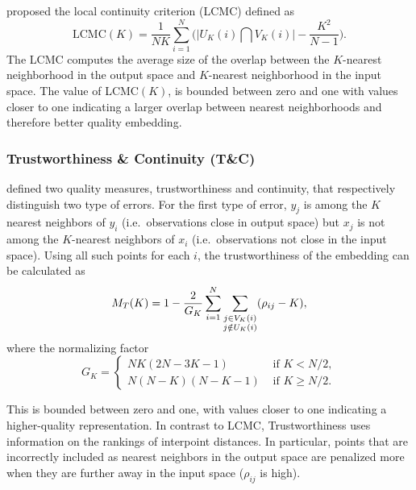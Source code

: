 \documentclass[11pt,a4paper,]{article}
\begin{document}
\textcite{Chen2009-su} proposed the local continuity criterion (LCMC) defined as
\begin{equation}\label{eq:LCMC}
  \text{LCMC}(K)=\frac{1}{N K} \sum_{i=1}^{N}\Big(\big| U_K(i) \bigcap V_K(i) \big| - \frac{K^{2}}{N-1}\Big).
\end{equation}
The LCMC computes the average size of the overlap between the \(K\)-nearest neighborhood in the output space and \(K\)-nearest neighborhood in the input space. The value of LCMC\((K)\), is bounded between zero and one with values closer to one indicating a larger overlap between nearest neighborhoods and therefore better quality embedding.

\hypertarget{trustworthiness-continuity-tc}{%
\subsubsection*{Trustworthiness \& Continuity (T\&C)}\label{trustworthiness-continuity-tc}}

\textcite{Venna2006-nd} defined two quality measures, trustworthiness and continuity, that respectively distinguish two type of errors. For the first type of error, \(y_j\) is among the \(K\) nearest neighbors of \(y_i\) (i.e.~observations close in output space) but \(x_j\) is not among the \(K\)-nearest neighbors of \(x_i\) (i.e.~observations not close in the input space). Using all such points for each \(i\), the trustworthiness of the embedding can be calculated as
\begin{equation}\label{eq:trustworthiness}
  M_{T}(K)=1-\frac{2}{G_{K}} \sum_{i=1}^{N} \sum\limits_{\begin{subarray}{c}j \in V_{K}(i)\\j \notin U_{K}(i)\end{subarray}}(\rho_{ij}-K),
\end{equation}
where the normalizing factor
\[
  G_{K}=\left\{
    \begin{array}{ll}
      N K(2 N-3 K-1) & \text { if } K<N / 2, \\
      N(N-K)(N-K-1) & \text { if } K \geq N / 2.
    \end{array}
  \right.
\]

This is bounded between zero and one, with values closer to one indicating a higher-quality representation. In contrast to LCMC, Trustworthiness uses information on the rankings of interpoint distances. In particular, points that are incorrectly included as nearest neighbors in the output space are penalized more when they are further away in the input space (\(\rho_{ij}\) is high).
\end{document}

